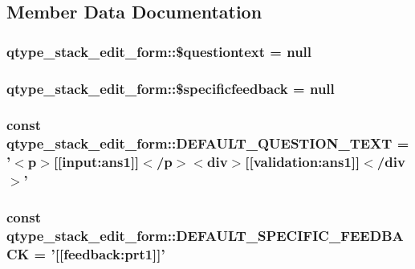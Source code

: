 \subsection{Member Data Documentation}
\hypertarget{classqtype__stack__edit__form_ac6ac60e3635c359ec4825035fe2f6e43}{
\subsubsection[{\$questiontext}]{\setlength{\rightskip}{0pt plus 5cm}qtype\_\-stack\_\-edit\_\-form::\$questiontext = null}}
\label{classqtype__stack__edit__form_ac6ac60e3635c359ec4825035fe2f6e43}
\hypertarget{classqtype__stack__edit__form_af38852011faeae9174aa27df145bbca8}{
\subsubsection[{\$specificfeedback}]{\setlength{\rightskip}{0pt plus 5cm}qtype\_\-stack\_\-edit\_\-form::\$specificfeedback = null}}
\label{classqtype__stack__edit__form_af38852011faeae9174aa27df145bbca8}
\hypertarget{classqtype__stack__edit__form_a4727a6b48985a79263c0a88619682593}{
\subsubsection[{DEFAULT\_\-QUESTION\_\-TEXT}]{\setlength{\rightskip}{0pt plus 5cm}const {\bf qtype\_\-stack\_\-edit\_\-form::DEFAULT\_\-QUESTION\_\-TEXT} = '$<$p$>$\mbox{[}\mbox{[}input:ans1\mbox{]}\mbox{]}$<$/p$>$$<$div$>$\mbox{[}\mbox{[}validation:ans1\mbox{]}\mbox{]}$<$/div$>$'}}
\label{classqtype__stack__edit__form_a4727a6b48985a79263c0a88619682593}
\hypertarget{classqtype__stack__edit__form_a5858ef26f537b7e427e241402ee1f272}{
\subsubsection[{DEFAULT\_\-SPECIFIC\_\-FEEDBACK}]{\setlength{\rightskip}{0pt plus 5cm}const {\bf qtype\_\-stack\_\-edit\_\-form::DEFAULT\_\-SPECIFIC\_\-FEEDBACK} = '\mbox{[}\mbox{[}feedback:prt1\mbox{]}\mbox{]}'}}
